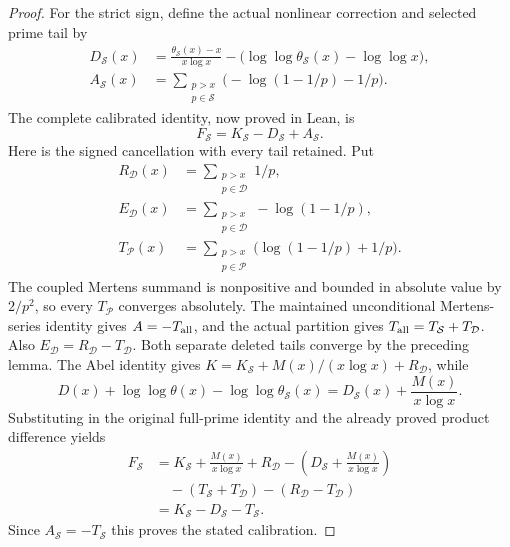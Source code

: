 \documentclass[11pt]{article}
\theoremstyle{definition}
\begin{document}
\begin{proof}
For the strict sign, define the actual nonlinear correction and selected
prime tail by
\[
 \begin{aligned}
 D_{\mathcal S}(x)
  &=\frac{\theta_{\mathcal S}(x)-x}{x\log x}
     -\bigl(\log\log\theta_{\mathcal S}(x)-\log\log x\bigr),\\
 A_{\mathcal S}(x)
  &=\sum_{\substack{p>x\\p\in\mathcal S}}
          \bigl(-\log(1-1/p)-1/p\bigr).
 \end{aligned}
\]
The complete calibrated identity, now proved in Lean, is
\[
 F_{\mathcal S}=K_{\mathcal S}-D_{\mathcal S}+A_{\mathcal S}.
\]
Here is the signed cancellation with every tail retained.
Put
\[
 \begin{aligned}
 R_{\mathcal D}(x)&=\sum_{\substack{p>x\\p\in\mathcal D}}1/p,\\
 E_{\mathcal D}(x)&=\sum_{\substack{p>x\\p\in\mathcal D}}-\log(1-1/p),\\
 T_{\mathcal P}(x)&=\sum_{\substack{p>x\\p\in\mathcal P}}
                         \bigl(\log(1-1/p)+1/p\bigr).
 \end{aligned}
\]
The coupled Mertens summand is nonpositive and bounded in absolute value
by $2/p^2$, so every $T_{\mathcal P}$ converges absolutely.
The maintained unconditional Mertens-series identity gives
$A=-T_{\rm all}$, and the actual partition gives
$T_{\rm all}=T_{\mathcal S}+T_{\mathcal D}$.
Also $E_{\mathcal D}=R_{\mathcal D}-T_{\mathcal D}$.
Both separate deleted tails converge by the preceding lemma.
The Abel identity gives
$K=K_{\mathcal S}+M(x)/(x\log x)+R_{\mathcal D}$, while
\[
 D(x)+\log\log\theta(x)-\log\log\theta_{\mathcal S}(x)
 =D_{\mathcal S}(x)+\frac{M(x)}{x\log x}.
\]
Substituting in the original full-prime identity and the already
proved product difference yields
\[
 \begin{aligned}
 F_{\mathcal S}
 &=K_{\mathcal S}+\frac{M(x)}{x\log x}+R_{\mathcal D}
    -\left(D_{\mathcal S}+\frac{M(x)}{x\log x}\right)\\
 &\hspace{1em}-(T_{\mathcal S}+T_{\mathcal D})
                    -(R_{\mathcal D}-T_{\mathcal D})\\
 &=K_{\mathcal S}-D_{\mathcal S}-T_{\mathcal S}.
 \end{aligned}
\]
Since $A_{\mathcal S}=-T_{\mathcal S}$ this proves the stated calibration.


\end{proof}
\end{document}
